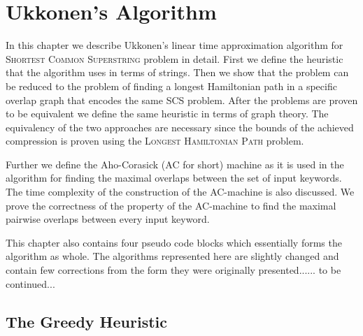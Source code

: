 \documentclass[english,twoside,censored,csm,algorithms-track-2020]{HYthesisML}
\theoremstyle{plain}
\theoremstyle{definition}
\begin{document}






\chapter{Ukkonen's Algorithm}

In this chapter we describe Ukkonen's linear time approximation algorithm for
\textsc{Shortest Common Superstring} problem in detail. First we define the heuristic that the
algorithm uses in terms of strings. Then we show that the problem can be reduced to the problem
of finding a longest Hamiltonian path in a specific overlap graph that encodes the same SCS problem.
After the problems are proven to be equivalent we define the same heuristic in terms of graph theory.
The equivalency of the two approaches are necessary since the bounds of the achieved compression
is proven using the \textsc{Longest Hamiltonian Path} problem.

Further we define the Aho-Corasick (AC for short) machine as it is used in the algorithm for finding
the maximal overlaps between the set of input keywords. The time complexity of the construction of
the AC-machine is also discussed. We prove the correctness of the property of the AC-machine to find
the maximal pairwise overlaps between every input keyword.

This chapter also contains four pseudo code blocks which essentially forms the algorithm as whole.
The algorithms represented here are slightly changed and contain few corrections from the form they
were originally presented...... to be continued...

\listofalgorithms

\section{The Greedy Heuristic}

  
\end{document}
